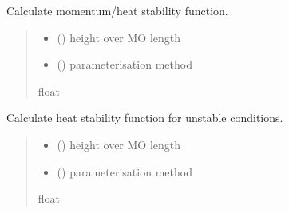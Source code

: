 \documentclass[letterpaper,10pt,english]{sphinxmanual}
\begin{document}
\begin{fulllineitems}

\pysigstartsignatures
{}
\pysigstopsignatures
\sphinxAtStartPar
Calculate momentum/heat stability function.
\begin{quote}\begin{description}
\begin{itemize}
\item {} 
\sphinxAtStartPar
{} () \textendash{} height over MO length

\item {} 
\sphinxAtStartPar
{} () \textendash{} parameterisation method

\end{itemize}

\sphinxAtStartPar
{}

\sphinxAtStartPar
float

\end{description}\end{quote}

\end{fulllineitems}



\begin{fulllineitems}

\pysigstartsignatures
{}
\pysigstopsignatures
\sphinxAtStartPar
Calculate heat stability function for unstable conditions.
\begin{quote}\begin{description}
\begin{itemize}
\item {} 
\sphinxAtStartPar
{} () \textendash{} height over MO length

\item {} 
\sphinxAtStartPar
{} () \textendash{} parameterisation method

\end{itemize}

\sphinxAtStartPar
{}

\sphinxAtStartPar
float

\end{description}\end{quote}

\end{fulllineitems}
\end{document}
